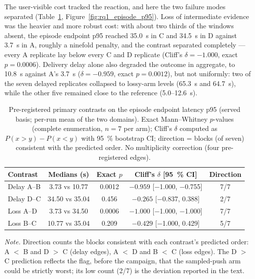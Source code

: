 The user-visible cost tracked the reaction, and here the two failure modes
separated (Table~\ref{tab:rq1_edges}, Figure~\ref{fig:rq1_episode_p95}).
Loss of intermediate evidence was the heavier and more robust cost: with
about two thirds of the windows absent, the episode endpoint p95 reached
35.0~s in C and 34.5~s in D against 3.7~s in A, roughly a ninefold penalty,
and the contrast separated completely --- every A replicate lay below every
C and D replicate (Cliff's $\delta = -1.000$, exact $p = 0.0006$). Delivery
delay alone also degraded the outcome in aggregate, to 10.8~s against A's
3.7~s ($\delta = -0.959$, exact $p = 0.0012$), but not uniformly: two of the
seven delayed replicates collapsed to lossy-arm levels (65.3~s and 64.7~s),
while the other five remained close to the reference (5.0--12.6~s).

\begin{table}[htbp]
    \centering
    \caption{Pre-registered primary contrasts on the episode endpoint latency
    p95 (served basis; per-run mean of the two domains). Exact Mann--Whitney
    $p$-values (complete enumeration, $n = 7$ per arm); Cliff's $\delta$
    computed as $P(x > y) - P(x < y)$ with 95~\% bootstrap CI; direction =
    blocks (of seven) consistent with the predicted order. No multiplicity
    correction (four pre-registered edges).}
    \label{tab:rq1_edges}
    \begin{tabular}{l c c c c}
        \toprule
        Contrast & Medians (s) & Exact $p$ & Cliff's $\delta$ [95~\% CI] & Direction \\
        \midrule
        Delay A--B & 3.73 vs 10.77 & 0.0012 & $-0.959$ [$-$1.000, $-$0.755] & 7/7 \\
        Delay D--C & 34.50 vs 35.04 & 0.456 & $-0.265$ [$-$0.837, 0.388] & 2/7 \\
        Loss A--D & 3.73 vs 34.50 & 0.0006 & $-1.000$ [$-$1.000, $-$1.000] & 7/7 \\
        Loss B--C & 10.77 vs 35.04 & 0.209 & $-0.429$ [$-$1.000, 0.429] & 5/7 \\
        \bottomrule
    \end{tabular}

    {\footnotesize\noindent\textit{Note.} Direction counts the blocks
    consistent with each contrast's predicted order: A $<$ B and D $>$ C
    (delay edges), A $<$ D and B $<$ C (loss edges). The D $>$ C prediction
    reflects the flag, before the campaign, that the sampled-push arm could
    be strictly worst; its low count (2/7) is the deviation reported in the
    text.\par}
\end{table}

